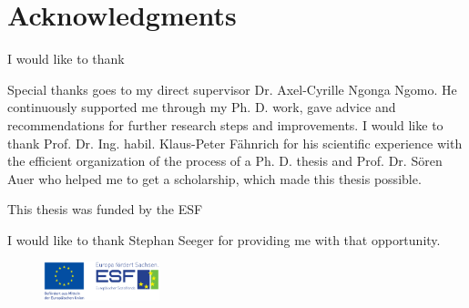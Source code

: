 



\bigskip

\begingroup
\let\clearpage\relax
\let\cleardoublepage\relax
\let\cleardoublepage\relax
\chapter*{Acknowledgments}
I would like to thank


Special thanks goes to my direct supervisor Dr. Axel-Cyrille Ngonga Ngomo.
He continuously supported me through my Ph. D. work, gave advice and recommendations for further research steps and improvements.
I would like to thank Prof. Dr. Ing. habil. Klaus-Peter F\"ahnrich for his scientific experience with the efficient organization of the process of a Ph. D. thesis and Prof. Dr. S\"oren Auer who helped me to get a scholarship, which made this thesis possible.   

This thesis was funded by the ESF

I would like to thank Stephan Seeger for providing me with that opportunity. 

\begin{figure}
 \vspace{-10mm}
 \includegraphics[width=0.3\textwidth]{figures/esf.pdf}
\end{figure}


